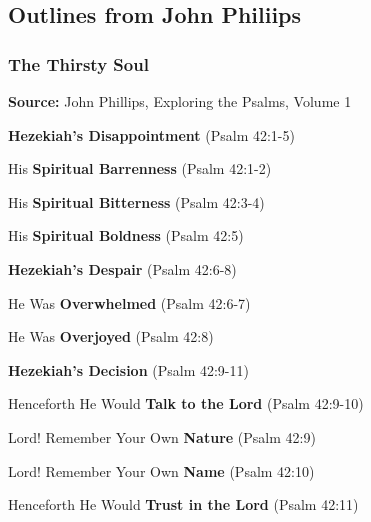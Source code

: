 \subsection{Outlines from John Philiips}

\subsubsection{The Thirsty Soul}

\textbf{Source: }John Phillips, Exploring the Psalms, Volume 1\cite{Phillips2001ExploringPsalms1}

\begin{compactenum}[I.]
    \item \textbf{Hezekiah's Disappointment} (Psalm 42:1-5)
    \begin{compactenum}[A.]
    		\item His   \textbf{Spiritual Barrenness} (Psalm 42:1-2)
    		\item His   \textbf{Spiritual Bitterness} (Psalm 42:3-4)
    		\item His   \textbf{Spiritual Boldness} (Psalm 42:5)
    \end{compactenum}
    \item \textbf{Hezekiah's Despair} (Psalm 42:6-8)
    \begin{compactenum}[A.]
    		\item He Was  \textbf{Overwhelmed} (Psalm 42:6-7)
    		\item He Was  \textbf{Overjoyed} (Psalm 42:8)
    \end{compactenum}
        \item \textbf{Hezekiah's Decision} (Psalm 42:9-11)
    \begin{compactenum}[A.]
    		\item Henceforth He Would  \textbf{Talk to the Lord} (Psalm 42:9-10)
    		\begin{compactenum}[1.]
    			\item Lord! Remember Your Own \textbf{Nature} (Psalm 42:9)
    			\item Lord! Remember Your Own \textbf{Name} (Psalm 42:10)
    		\end{compactenum}   
    		\item Henceforth He Would  \textbf{Trust in the Lord} (Psalm 42:11)
    \end{compactenum}
\end{compactenum}